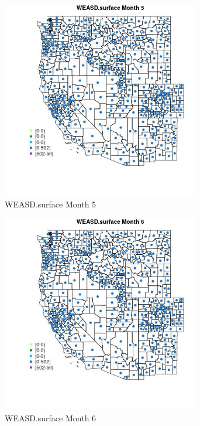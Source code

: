 \begin{figure} 
\centering  
\includegraphics[width=0.77\textwidth]{Code_Outputs/df_report_ML_predictors_CountyCentroid_Locations_Dates_2008-01-01to2018-12-31_MapObsMo5WEASDsurface.jpg} 
\caption{\label{fig:df_report_ML_predictors_CountyCentroid_Locations_Dates_2008-01-01to2018-12-31MapObsMo5WEASDsurface}WEASD.surface Month 5} 
\end{figure} 
 

\begin{figure} 
\centering  
\includegraphics[width=0.77\textwidth]{Code_Outputs/df_report_ML_predictors_CountyCentroid_Locations_Dates_2008-01-01to2018-12-31_MapObsMo6WEASDsurface.jpg} 
\caption{\label{fig:df_report_ML_predictors_CountyCentroid_Locations_Dates_2008-01-01to2018-12-31MapObsMo6WEASDsurface}WEASD.surface Month 6} 
\end{figure} 
 

